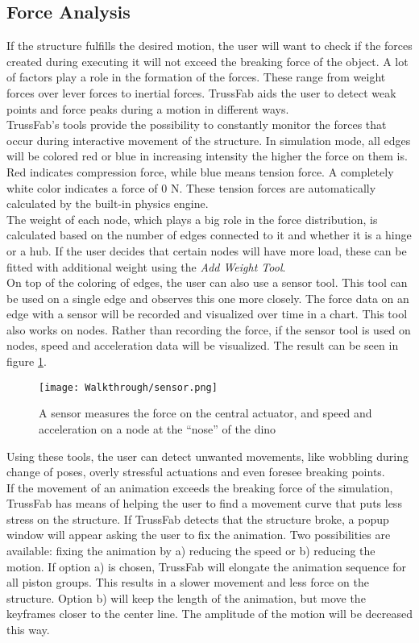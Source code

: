 \subsection{Force Analysis}
If the structure fulfills the desired motion, the user will want to check if the forces created during executing it will not exceed the breaking force of the object. A lot of factors play a role in the formation of the forces. These range from weight forces over lever forces to inertial forces. TrussFab aids the user to detect weak points and force peaks during a motion in different ways.\\
TrussFab's tools provide the possibility to constantly monitor the forces that occur during interactive movement of the structure. In simulation mode, all edges will be colored red or blue in increasing intensity the higher the force on them is. Red indicates compression force, while blue means tension force. A completely white color indicates a force of 0 N. These tension forces are automatically calculated by the built-in physics engine.\\
The weight of each node, which plays a big role in the force distribution, is calculated based on the number of edges connected to it and whether it is a hinge or a hub. If the user decides that certain nodes will have more load, these can be fitted with additional weight using the \textit{Add Weight Tool}.\\
On top of the coloring of edges, the user can also use a sensor tool. This tool can be used on a single edge and observes this one more closely. The force data on an edge with a sensor will be recorded and visualized over time in a chart. This tool also works on nodes. Rather than recording the force, if the sensor tool is used on nodes, speed and acceleration data will be visualized. The result can be seen in figure \ref{fig:sensor}.\\
\begin{figure}[h!]
    \texttt{[image: Walkthrough/sensor.png]}
    \centering
    \caption{A sensor measures the force on the central actuator, and speed and acceleration on a node at the ``nose'' of the dino}
    \label{fig:sensor}
\end{figure}
Using these tools, the user can detect unwanted movements, like wobbling during change of poses, overly stressful actuations and even foresee breaking points.\\
If the movement of an animation exceeds the breaking force of the simulation, TrussFab has means of helping the user to find a movement curve that puts less stress on the structure. If TrussFab detects that the structure broke, a popup window will appear asking the user to fix the animation. Two possibilities are available: fixing the animation by a) reducing the speed or b) reducing the motion. If option a) is chosen, TrussFab will elongate the animation sequence for all piston groups. This results in a slower movement and less force on the structure. Option b) will keep the length of the animation, but move the keyframes closer to the center line. The amplitude of the motion will be decreased this way.\\
